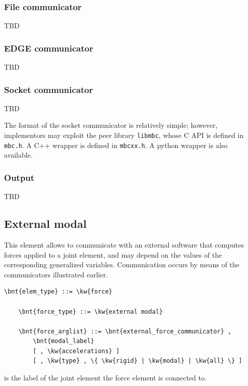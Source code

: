 \subsubsection{File communicator}
TBD

\subsubsection{EDGE communicator}
TBD

\subsubsection{Socket communicator}
TBD

The format of the socket communicator is relatively simple;
however, implementors may exploit the peer library \texttt{libmbc},
whose C API is defined in \texttt{mbc.h}.
A C++ wrapper is defined in \texttt{mbcxx.h}.
A python wrapper is also available.

\subsubsection{Output}
TBD



\subsection{External modal}
\label{sec:EL:FORCE:EXTERNAL:MODAL}
This element allows to communicate with an external software that computes
forces applied to a 
 joint element,
and may depend on the values of the corresponding generalized variables.
Communication occurs by means of the communicators illustrated earlier.
\begin{Verbatim}[commandchars=\\\{\}]
    \bnt{elem_type} ::= \kw{force}

    \bnt{force_type} ::= \kw{external modal}

    \bnt{force_arglist} ::= \bnt{external_force_communicator} ,
        \bnt{modal_label}
        [ , \kw{accelerations} ]
        [ , \kw{type} , \{ \kw{rigid} | \kw{modal} | \kw{all} \} ]
\end{Verbatim}
 is the label of the 
 joint element
the force element is connected to.

